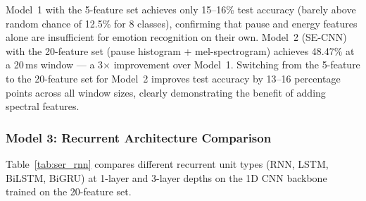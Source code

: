 \begin{table}[h]
\centering
\caption{RAVDESS test and train accuracy (\%) for Models 1--2 across window sizes (8-class classification).}
\label{tab:ser_window}
\end{table}

Model~1 with the 5-feature set achieves only 15--16\% test accuracy (barely above random chance of 12.5\% for 8 classes), confirming that pause and energy features alone are insufficient for emotion recognition on their own. Model~2 (SE-CNN) with the 20-feature set (pause histogram + mel-spectrogram) achieves 48.47\% at a 20\,ms window — a 3$\times$ improvement over Model~1. Switching from the 5-feature to the 20-feature set for Model~2 improves test accuracy by 13--16 percentage points across all window sizes, clearly demonstrating the benefit of adding spectral features.

\subsubsection{Model 3: Recurrent Architecture Comparison}

Table~\ref{tab:ser_rnn} compares different recurrent unit types (RNN, LSTM, BiLSTM, BiGRU) at 1-layer and 3-layer depths on the 1D CNN backbone trained on the 20-feature set.

